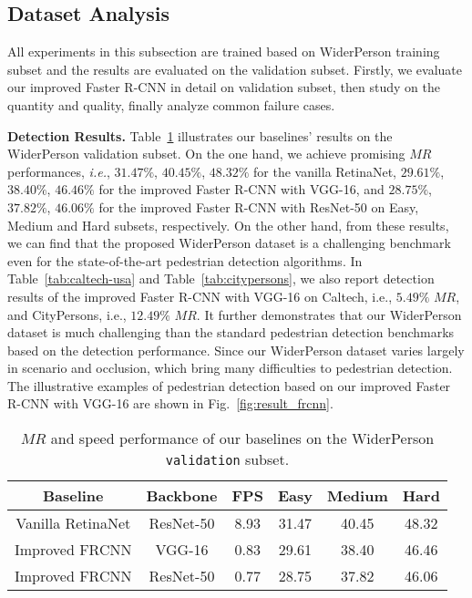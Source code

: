 \documentclass[journal]{IEEEtran}
\def\ie{{\em i.e.}}
\begin{document}
\subsection{Dataset Analysis}\label{sec:exp_ana}
All experiments in this subsection are trained based on WiderPerson training subset and the results are evaluated on the validation subset. Firstly, we evaluate our improved Faster R-CNN in detail on validation subset, then study on the quantity and quality, finally analyze common failure cases.

{\flushleft \textbf{Detection Results. }}
Table~\ref{tab:eval-frcnn} illustrates our baselines' results on the WiderPerson validation subset. On the one hand, we achieve promising $MR$ performances, \ie, $31.47\%$, $40.45\%$, $48.32\%$ for the vanilla RetinaNet, $29.61\%$, $38.40\%$, $46.46\%$ for the improved Faster R-CNN with VGG-16, and $28.75\%$, $37.82\%$, $46.06\%$ for the improved Faster R-CNN with ResNet-50 on Easy, Medium and Hard subsets, respectively. On the other hand, from these results, we can find that the proposed WiderPerson dataset is a challenging benchmark even for the state-of-the-art pedestrian detection algorithms. In Table~\ref{tab:caltech-usa} and Table~\ref{tab:citypersons}, we also report detection results of the improved Faster R-CNN with VGG-16 on Caltech, i.e., $5.49\%$ $MR$, and CityPersons, i.e., $12.49\%$ $MR$. It further demonstrates that our WiderPerson dataset is much challenging than the standard pedestrian detection benchmarks based on the detection performance. Since our WiderPerson dataset varies largely in scenario and occlusion, which bring many difficulties to pedestrian detection. The illustrative examples of pedestrian detection based on our improved Faster R-CNN with VGG-16 are shown in Fig.~\ref{fig:result_frcnn}.

\begin{table}[t]
\centering
\caption{$MR$ and speed performance of our baselines on the WiderPerson {\tt validation} subset.}
\label{tab:eval-frcnn}
\setlength{\tabcolsep}{6.5pt}
\begin{tabular}{cccccc}
\toprule[2pt]
Baseline &Backbone &FPS & Easy & Medium & Hard \\
\midrule
Vanilla RetinaNet & ResNet-50 &8.93 & {31.47} & {40.45} & {48.32} \\
Improved FRCNN & VGG-16 &0.83 & {29.61} & {38.40} & {46.46} \\
Improved FRCNN & ResNet-50 &0.77 & {28.75} & {37.82} & {46.06} \\
\bottomrule[2pt]
\end{tabular}
\end{table}
\end{document}
